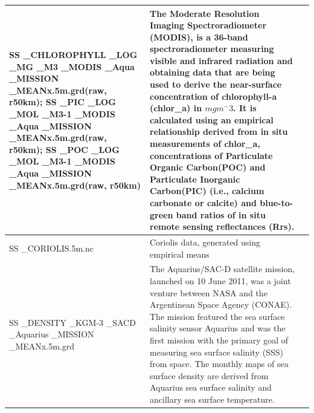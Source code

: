\documentclass[journal abbreviation, manuscript]{copernicus}
\begin{document}
\begin{longtable}{|p{}|p{}|p{}|}
        SS \_CHLOROPHYLL \_LOG \_MG \_M3 \_MODIS \_Aqua \_MISSION \_MEANx.5m.grd(raw, r50km); SS \_PIC \_LOG \_MOL \_M3-1 \_MODIS \_Aqua \_MISSION \_MEANx.5m.grd(raw, r50km); SS \_POC \_LOG \_MOL \_M3-1 \_MODIS \_Aqua \_MISSION \_MEANx.5m.grd(raw, r50km)  & The Moderate Resolution Imaging Spectroradiometer (MODIS), is a 36-band spectroradiometer measuring visible and infrared radiation and obtaining data that are being used to derive the near-surface concentration of chlorophyll-a (chlor\_a) in $mg m^-3$. It is calculated using an empirical relationship derived from in situ measurements of chlor\_a, concentrations of Particulate Organic Carbon(POC) and Particulate Inorganic Carbon(PIC) (i.e., calcium carbonate or calcite) and blue-to-green band ratios of in situ remote sensing reflectances (Rrs). & \cite{nasaaqua} \\
        \hline 
        SS \_CORIOLIS.5m.nc  & Coriolis data, generated using empirical means & \cite{lee_2020_3675364}\\
        \hline 
        SS \_DENSITY \_KGM-3 \_SACD \_Aquarius \_MISSION \_MEANx.5m.grd & The Aquarius/SAC-D satellite mission, launched on 10 June 2011, was a joint venture between NASA and the Argentinean Space Agency (CONAE). The mission featured the sea surface salinity sensor Aquarius and was the first mission with the primary goal of measuring sea surface salinity (SSS) from space. The monthly maps of sea surface density are derived from Aquarius sea surface salinity and ancillary sea surface temperature.  & \cite{nasaaquarius} \\
        \hline 


\end{longtable}
\end{document}
